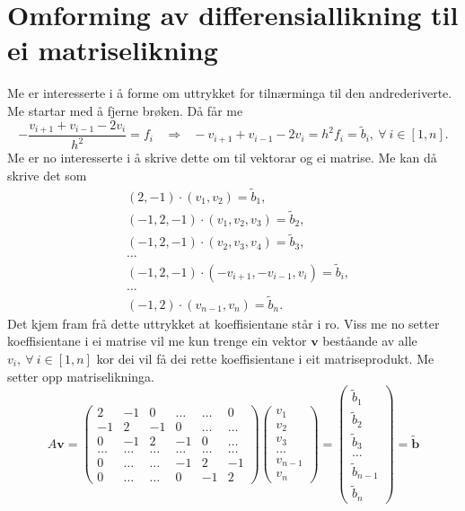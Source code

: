 \documentclass[11pt, a4paper]{article}
\begin{document}
\section{Omforming av differensiallikning til ei matriselikning}
  Me er interesserte i å forme om uttrykket for tilnærminga til den andrederiverte. Me startar med å 
  fjerne brøken. Då får me
  \begin{equation*}
    -\frac{v_{i+1} + v_{i-1} - 2v_i}{h^2} = f_i \ \ \ \ \Rightarrow \ \ \
    -v_{i+1} + v_{i-1} - 2v_i = h^2f_i = \tilde{b}_i, \ \forall \ i \in [1, n].
  \end{equation*}
  Me er no interesserte i å skrive dette om til vektorar og ei matrise. Me kan då skrive det som
  \begin{equation*}
    \begin{align}
      &(2, -1)\cdot(v_1, v_2) = \tilde{b}_1, \\
      &(-1, 2, -1)\cdot(v_1, v_2, v_3) = \tilde{b}_2, \\
      &(-1, 2, -1)\cdot(v_2, v_3, v_4) = \tilde{b}_3, \\
      &\dots \\
      &(-1, 2, -1)\cdot(-v_{i+1}, -v_{i-1}, v_i) = \tilde{b}_i, \\
      &\dots \\
      &(-1, 2)\cdot(v_{n-1}, v_{n}) = \tilde{b}_n.
    \end{align}
  \end{equation*}
  Det kjem fram frå dette uttrykket at koeffisientane står i ro. Viss me no setter koeffisientane i ei
  matrise vil me kun trenge ein vektor $\mathbf{v}$ beståande av alle $v_i, \ \forall \ i \in [1, n]$
  kor dei vil få dei rette koeffisientane i eit matriseprodukt. Me setter opp matriselikninga.
  \begin{equation*}
    A\mathbf{v} = 
    \begin{pmatrix}
      2 & -1 & 0 & \dots & \dots & 0 \\
      -1 & 2 & -1 & 0 & \dots & \dots \\
      0 & -1 & 2 & -1 & 0 & \dots \\
      \dots & \dots & \dots & \dots & \dots & \dots \\
      0 & \dots & \dots & -1 & 2 & -1 \\
      0 & \dots & \dots & 0 & -1 & 2
    \end{pmatrix}
    \begin{pmatrix}
      v_1 \\
      v_2 \\
      v_3 \\
      \dots \\
      v_{n-1} \\
      v_{n}
    \end{pmatrix} = 
    \begin{pmatrix}
      \tilde{b}_1 \\
      \tilde{b}_2 \\
      \tilde{b}_3 \\       
      \dots \\
      \tilde{b}_{n-1} \\
      \tilde{b}_n
    \end{pmatrix} = \mathbf{\tilde{b}}
  \end{equation*}
\end{document}

